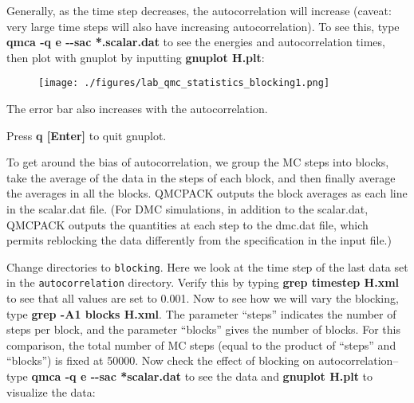 Generally, as the time step decreases, the autocorrelation will increase
(caveat: very large time steps will also have increasing autocorrelation). To
see this, type \textbf{qmca -q e {-}{-}sac *.scalar.dat} to see the energies
and autocorrelation times, then plot with gnuplot by inputting \textbf{gnuplot
H.plt}:

\FloatBarrier
\begin{figure}[ht!]
\begin{center}
\texttt{[image: ./figures/lab\_qmc\_statistics\_blocking1.png]}
\end{center}
\end{figure}
\FloatBarrier


The error bar also increases with the autocorrelation.  

Press \textbf{q [Enter]} to quit gnuplot.

To get around the bias of autocorrelation, we group the MC steps into blocks,
take the average of the data in the steps of each block, and then finally
average the averages in all the blocks.  QMCPACK outputs the block averages as
each line in the scalar.dat file.  (For DMC simulations, in addition to the
scalar.dat, QMCPACK outputs the quantities at each step to the dmc.dat file,
which permits reblocking the data differently from the specification in the
input file.) 

Change directories to \texttt{blocking}.  Here we look at the time step of the
last data set in the \texttt{autocorrelation} directory.  Verify this by typing
\textbf{grep timestep H.xml} to see that all values are set to 0.001.  Now to
see how we will vary the blocking, type \textbf{grep -A1 blocks H.xml}.  The
parameter ``steps'' indicates the number of steps per block, and the parameter
``blocks'' gives the number of blocks.  For this comparison, the total number
of MC steps (equal to the product of ``steps'' and ``blocks'') is fixed at
50000.  Now check the effect of blocking on autocorrelation--type \textbf{qmca
-q e {-}{-}sac *scalar.dat} to see the data and \textbf{gnuplot H.plt} to
visualize the data:

